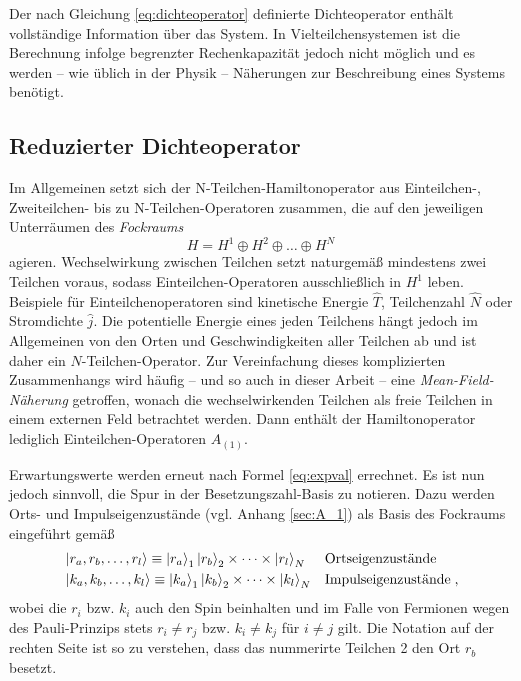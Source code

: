 Der nach Gleichung \eqref{eq:dichteoperator} definierte Dichteoperator enthält vollständige Information über das System. In Vielteilchensystemen ist die Berechnung infolge begrenzter Rechenkapazität jedoch nicht möglich und es werden -- wie üblich in der Physik -- Näherungen zur Beschreibung eines Systems benötigt.

\subsection{Reduzierter Dichteoperator}
Im Allgemeinen setzt sich der N-Teilchen-Hamiltonoperator aus Einteilchen-, Zweiteilchen- bis zu N-Teilchen-Operatoren zusammen, die auf den jeweiligen Unterräumen des \emph{Fockraums} 
\begin{equation*}
  H = H^1 \oplus H^2 \oplus \dots \oplus H^N
\end{equation*}
agieren. Wechselwirkung zwischen Teilchen setzt naturgemäß mindestens zwei Teilchen voraus, sodass Einteilchen-Operatoren ausschließlich in $H^1$ leben. Beispiele für Einteilchenoperatoren sind kinetische Energie $\hat{T}$, Teilchenzahl $\hat{N}$ oder Stromdichte $\hat{j}$. Die potentielle Energie eines jeden Teilchens hängt jedoch im Allgemeinen von den Orten und Geschwindigkeiten aller Teilchen ab und ist daher ein $N$-Teilchen-Operator. Zur Vereinfachung dieses komplizierten Zusammenhangs wird häufig -- und so auch in dieser Arbeit -- eine  \emph{Mean-Field-Näherung} getroffen, wonach die wechselwirkenden Teilchen als freie Teilchen in einem externen Feld betrachtet werden. Dann enthält der Hamiltonoperator lediglich Einteilchen-Operatoren $\hat{A}_{(1)}$.

Erwartungswerte werden erneut nach Formel \eqref{eq:expval} errechnet. Es ist nun jedoch sinnvoll, die Spur in der Besetzungszahl-Basis zu notieren. Dazu werden Orts- und Impulseigenzustände (vgl. Anhang \ref{sec:A_1}) als Basis des Fockraums eingeführt gemäß
\begin{align*}
  &\ket{r_a,r_b, \dots, r_l} \equiv \ket{r_a}_1 \ket{r_b}_2 \times \dots \times \ket{r_l}_N  & &\text{Ortseigenzustände} \\
  &\ket{k_a,k_b, \dots, k_l} \equiv \ket{k_a}_1 \ket{k_b}_2 \times \dots \times \ket{k_l}_N  & &\text{Impulseigenzustände} \; ,
\end{align*}
wobei die $r_i$ bzw. $k_i$ auch den Spin beinhalten und im Falle von Fermionen wegen des Pauli-Prinzips stets $r_i\neq r_j$ bzw. $k_i \neq k_j$ für $i\neq j$ gilt. Die Notation auf der rechten Seite ist so zu verstehen, dass das nummerirte Teilchen 2 den Ort $r_b$ besetzt.

